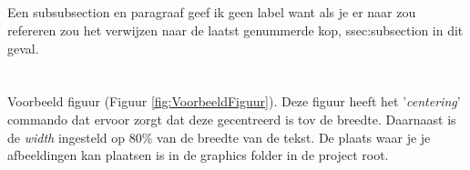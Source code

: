 \subsection{}%
\label{ssec:subsection}

\subsubsection{}%

Een subsubsection en paragraaf geef ik geen label want als je er naar zou refereren zou het verwijzen naar de laatst genummerde kop, ssec:subsection in dit geval.

\paragraph{}%



\section{}%
\label{sec:fig&cf}

\paragraph{}%
\label{ssec:figuren}

Voorbeeld figuur (Figuur \ref{fig:VoorbeeldFiguur})\autocite{Astley2009}. Deze figuur heeft het '\textit{centering}' commando dat ervoor zorgt dat deze gecentreerd is tov de breedte. Daarnaast is de \textit{width} ingesteld op 80\% van de breedte van de tekst. De plaats waar je je afbeeldingen kan plaatsen is in de graphics folder in de project root.

